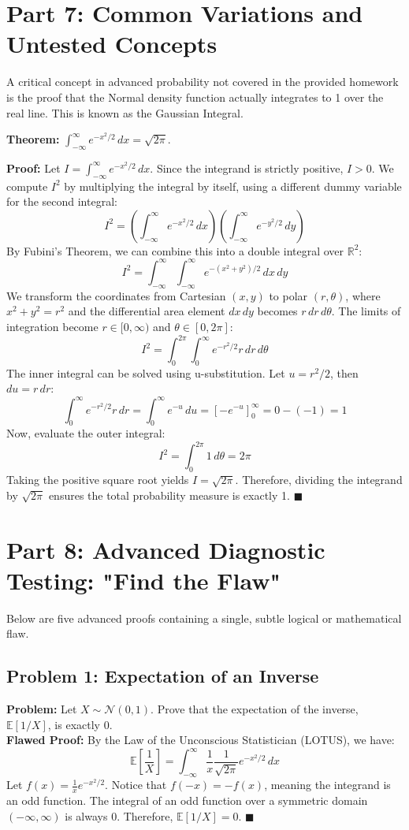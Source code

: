 \documentclass[11pt, a4paper]{article}
\theoremstyle{definition}
\theoremstyle{remark}
\newcommand{\R}{\mathbb{R}}
\newcommand{\E}{\mathbb{E}}
\begin{document}
\newpage
\section{Part 7: Common Variations and Untested Concepts}

A critical concept in advanced probability not covered in the provided homework is the proof that the Normal density function actually integrates to 1 over the real line. This is known as the Gaussian Integral.

\textbf{Theorem:} $\int_{-\infty}^{\infty} e^{-x^2/2} \, dx = \sqrt{2\pi}$.

\textbf{Proof:}
Let $I = \int_{-\infty}^{\infty} e^{-x^2/2} \, dx$. Since the integrand is strictly positive, $I > 0$. We compute $I^2$ by multiplying the integral by itself, using a different dummy variable for the second integral:
\[ I^2 = \left( \int_{-\infty}^{\infty} e^{-x^2/2} \, dx \right) \left( \int_{-\infty}^{\infty} e^{-y^2/2} \, dy \right) \]
By Fubini's Theorem, we can combine this into a double integral over $\R^2$:
\[ I^2 = \int_{-\infty}^{\infty} \int_{-\infty}^{\infty} e^{-(x^2 + y^2)/2} \, dx \, dy \]
We transform the coordinates from Cartesian $(x,y)$ to polar $(r, \theta)$, where $x^2 + y^2 = r^2$ and the differential area element $dx \, dy$ becomes $r \, dr \, d\theta$. The limits of integration become $r \in [0, \infty)$ and $\theta \in [0, 2\pi]$:
\[ I^2 = \int_{0}^{2\pi} \int_{0}^{\infty} e^{-r^2/2} r \, dr \, d\theta \]
The inner integral can be solved using u-substitution. Let $u = r^2/2$, then $du = r \, dr$:
\[ \int_{0}^{\infty} e^{-r^2/2} r \, dr = \int_{0}^{\infty} e^{-u} \, du = \left[ -e^{-u} \right]_{0}^{\infty} = 0 - (-1) = 1 \]
Now, evaluate the outer integral:
\[ I^2 = \int_{0}^{2\pi} 1 \, d\theta = 2\pi \]
Taking the positive square root yields $I = \sqrt{2\pi}$. Therefore, dividing the integrand by $\sqrt{2\pi}$ ensures the total probability measure is exactly 1. $\blacksquare$

\newpage
\section{Part 8: Advanced Diagnostic Testing: "Find the Flaw"}

Below are five advanced proofs containing a single, subtle logical or mathematical flaw. 

\subsection{Problem 1: Expectation of an Inverse}
\textbf{Problem:} Let $X \sim \mathcal{N}(0,1)$. Prove that the expectation of the inverse, $\E[1/X]$, is exactly $0$. \\
\textbf{Flawed Proof:} By the Law of the Unconscious Statistician (LOTUS), we have:
\[ \E\left[\frac{1}{X}\right] = \int_{-\infty}^{\infty} \frac{1}{x} \frac{1}{\sqrt{2\pi}} e^{-x^2/2} \, dx \]
Let $f(x) = \frac{1}{x} e^{-x^2/2}$. Notice that $f(-x) = -f(x)$, meaning the integrand is an odd function. The integral of an odd function over a symmetric domain $(-\infty, \infty)$ is always $0$. Therefore, $\E[1/X] = 0$. $\blacksquare$
\end{document}
